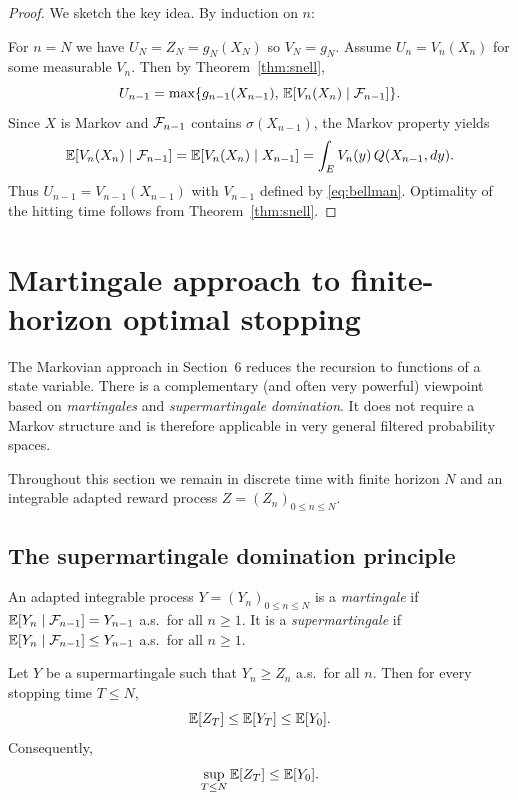 \begin{proof}
We sketch the key idea. By induction on $n$:

For $n=N$ we have $U_N=Z_N=g_N(X_N)$ so $V_N=g_N$.
Assume $U_n=V_n(X_n)$ for some measurable $V_n$.
Then by Theorem~\ref{thm:snell},
\[
U_{n-1}=\max\{g_{n-1}(X_{n-1}),\,\mathbb{E}[V_n(X_n)\mid \mathcal{F}_{n-1}]\}.
\]
Since $X$ is Markov and $\mathcal{F}_{n-1}$ contains $\sigma(X_{n-1})$, the Markov property yields
\[
\mathbb{E}[V_n(X_n)\mid \mathcal{F}_{n-1}] = \mathbb{E}[V_n(X_n)\mid X_{n-1}]
= \int_E V_n(y)\,Q(X_{n-1},dy).
\]
Thus $U_{n-1}=V_{n-1}(X_{n-1})$ with $V_{n-1}$ defined by \eqref{eq:bellman}.
Optimality of the hitting time follows from Theorem~\ref{thm:snell}.
\end{proof}

\section{Martingale approach to finite-horizon optimal stopping}\label{sec:martingale_approach}

The Markovian approach in Section~6 reduces the recursion to functions of a state variable.
There is a complementary (and often very powerful) viewpoint based on \emph{martingales} and
\emph{supermartingale domination}.  It does not require a Markov structure and is therefore applicable
in very general filtered probability spaces.

Throughout this section we remain in discrete time with finite horizon $N$ and an integrable adapted
reward process $Z=(Z_n)_{0\le n\le N}$.

\subsection{The supermartingale domination principle}

\begin{definition}
An adapted integrable process $Y=(Y_n)_{0\le n\le N}$ is a \emph{martingale} if
$\mathbb{E}[Y_n\mid \mathcal{F}_{n-1}]=Y_{n-1}$ a.s.\ for all $n\ge 1$.
It is a \emph{supermartingale} if $\mathbb{E}[Y_n\mid \mathcal{F}_{n-1}]\le Y_{n-1}$ a.s.\ for all $n\ge 1$.
\end{definition}

\begin{proposition}\label{prop:domination_upper_bound}
Let $Y$ be a supermartingale such that $Y_n\ge Z_n$ a.s.\ for all $n$.
Then for every stopping time $T\le N$,
\[
\mathbb{E}[Z_T]\le \mathbb{E}[Y_T]\le \mathbb{E}[Y_0].
\]
Consequently,
\[
\sup_{T\le N}\mathbb{E}[Z_T] \le \mathbb{E}[Y_0].
\]
\end{proposition}

